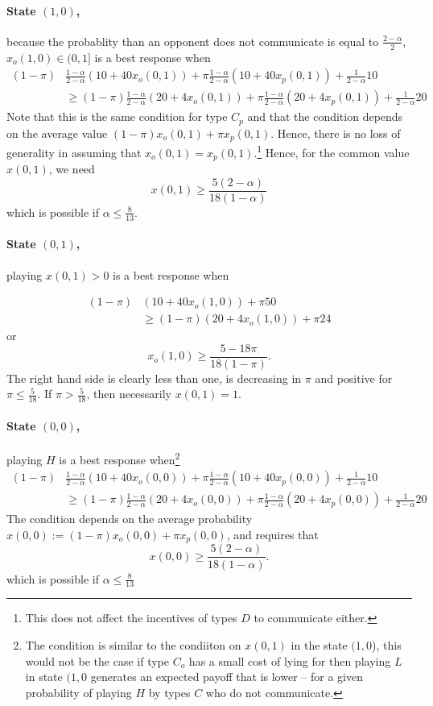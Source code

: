 \documentclass[12pt]{article}
\begin{document}
\paragraph{State $(1,0)$,} because the probablity than an opponent does not communicate is equal to $\frac{2-\alpha}{2}$, $x_o(1,0)\in(0,1]$ is a best response when
\begin{align*}
	(1-\pi)&\frac{1-\alpha}{2-\alpha} (10+40x_o(0,1))+\pi \frac{1-\alpha}{2-\alpha}(10+40 x_p(0,1))+\frac{1}{2-\alpha}10\\
		&\geq (1-\pi)\frac{1-\alpha}{2-\alpha} (20+4x_o(0,1))+\pi \frac{1-\alpha}{2-\alpha}(20+4 x_p(0,1)) +\frac{1}{2-\alpha}20
\end{align*}
Note that this is the same condition for type $C_p$ and that the condition depends on the average value $(1-\pi)x_o(0,1)+\pi x_p(0,1)$. Hence, there is no loss of generality in assuming that $x_o(0,1)=x_p(0,1)$.\footnote{%
This does not affect the incentives of types $D$ to communicate either.} Hence, for the common value $x(0,1)$, we need
\[
x(0,1)\geq\frac{5(2-\alpha)}{18(1-\alpha)}
\]
which is possible if $\alpha\leq \frac{8}{13}.$

\paragraph{State $(0,1)$,} playing $x(0,1)>0$ is a best response when

\begin{align*}
	(1-\pi) &(10+40x_o(1,0))+\pi 50\\
		&\geq(1-\pi) (20+4x_o(1,0))+\pi  24
\end{align*}
or
\[
x_o(1,0)\geq\frac{5-18\pi}{18(1-\pi)}.
\]
The right hand side is clearly less than one, is decreasing in $\pi$ and positive for $\pi\leq\frac{5}{18}$. If $\pi>\frac{5}{18}$, then necessarily $x(0,1)=1$.

\paragraph{State $(0,0)$,} playing $H$ is a best response when\footnote{%
The condition is similar to the condiiton on $x(0,1)$ in the state $(1,0$),  this would not be the case if type $C_o$ has a small cost of lying for then playing $L$ in state $(1,0$ generates an expected payoff that is lower -- for a given probability of playing $H$ by types $C$ who do not communicate.}
\begin{align*}
	(1-\pi)&\frac{1-\alpha}{2-\alpha} (10+40x_o(0,0))+\pi \frac{1-\alpha}{2-\alpha}(10+40 x_p(0,0))+\frac{1}{2-\alpha}10\\
		&\geq  (1-\pi)\frac{1-\alpha}{2-\alpha} (20+4x_o(0,0))+\pi \frac{1-\alpha}{2-\alpha}(20+4 x_p(0,0)) +\frac{1}{2-\alpha}20
\end{align*}
The condition depends on the average probability $x(0,0):=(1-\pi)x_o(0,0)+\pi x_p(0,0)$, and requires that
\[
x(0,0)\geq \frac{5(2-\alpha)}{18(1-\alpha)}.
\]
which is possible if $\alpha\leq \frac{8}{13}$
\end{document}
